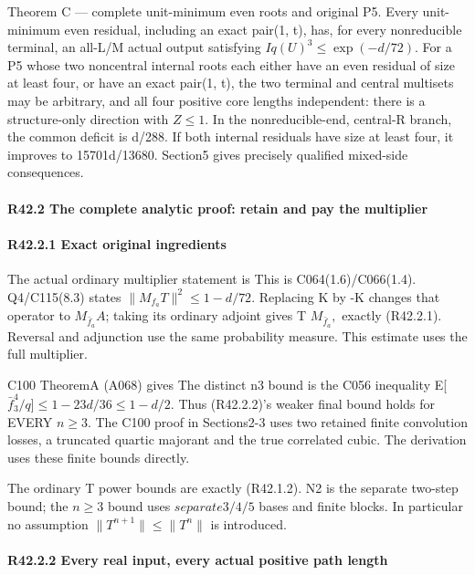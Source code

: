 Theorem C — complete unit-minimum even roots and original P5.
Every unit-minimum even residual, including an exact pair(1, t), has,
for every nonreducible terminal, an all-L/M actual output satisfying
\(Iq(U)^3\le \exp(-d/72).\)
For a P5 whose two noncentral internal roots each either have an even
residual of size at least four, or have an exact pair(1, t), the two
terminal and central multisets may be arbitrary, and all four positive
core lengths independent: there is a structure-only direction with \(Z\le 1.\)
In the nonreducible-end, central-R branch, the common deficit is d/288.
If both internal residuals have size at least four, it improves to
15701d/13680. Section5 gives precisely qualified mixed-side consequences.

\paragraph{R42.2 The complete analytic proof: retain and pay the multiplier}

\paragraph{R42.2.1 Exact original ingredients}

The actual ordinary multiplier statement is
This is C064(1.6)/C066(1.4). Q4/C115(8.3) states
\(\lVert M_{f_a}T\rVert ^2\le 1-d/72.\) Replacing K by -K changes that operator to
\(M_{\bar f_a}A\); taking its ordinary adjoint gives T \(M_{\bar f_a},\allowbreak \) exactly (R42.2.1).
Reversal and adjunction use the same probability measure.
This estimate uses the full multiplier.

C100 TheoremA (A068) gives
The distinct n3 bound is the C056 inequality
E[\(\bar f_3^4/q\)]\ensuremath{\le}\(1-23d/36\le 1-d/2.\) Thus (R42.2.2)'s weaker final bound holds for
EVERY \(n\ge 3.\) The C100 proof in Sections2-3 uses
two retained finite convolution losses, a truncated quartic majorant and
the true correlated cubic. The derivation uses these finite bounds directly.

The ordinary T power bounds are exactly (R42.1.2). N2 is the separate
two-step bound; the \(n\ge 3\) bound uses \(separate3/4/5\) bases and finite
blocks. In particular no assumption \(\lVert T^{n+1}\rVert \le \lVert T^n\rVert \) is introduced.

\paragraph{R42.2.2 Every real input, every actual positive path length}

